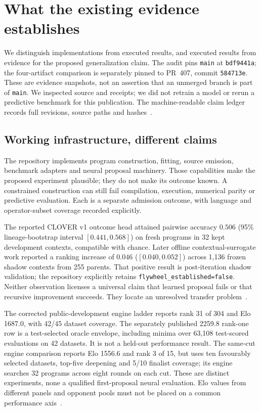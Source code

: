 \section{What the existing evidence establishes}
\label{sec:evidence}

We distinguish implementations from executed results, and executed results from evidence for the proposed generalization claim. The audit pins \texttt{main} at \texttt{bdf9441a}; the four-artifact comparison is separately pinned to PR~407, commit \texttt{584713e}. These are evidence snapshots, not an assertion that an unmerged branch is part of \texttt{main}. We inspected source and receipts; we did not retrain a model or rerun a predictive benchmark for this publication. The machine-readable claim ledger records full revisions, source paths and hashes~\citep{jope,clover}.

\subsection{Working infrastructure, different claims}
The repository implements program construction, fitting, source emission, benchmark adapters and neural proposal machinery. Those capabilities make the proposed experiment plausible; they do not make its outcome known. A constrained construction can still fail compilation, execution, numerical parity or predictive evaluation. Each is a separate admission outcome, with language and operator-subset coverage recorded explicitly.

The reported CLOVER v1 outcome head attained pairwise accuracy $0.506$ (95\% lineage-bootstrap interval $[0.441,0.568]$) on fresh programs in 32 kept development contexts, compatible with chance. Later offline contextual-surrogate work reported a ranking increase of $0.046$ ($[0.040,0.052]$) across 1,136 frozen shadow contexts from 255 parents. That positive result is post-iteration shadow validation; the repository explicitly retains \texttt{flywheel\_established=false}. Neither observation licenses a universal claim that learned proposal fails or that recursive improvement succeeds. They locate an unresolved transfer problem~\citep{clover}.

The corrected public-development engine ladder reports rank 31 of 304 and Elo 1687.0, with 42/45 dataset coverage. The separately published 2259.8 rank-one row is a test-selected oracle envelope, including minima over 63,108 test-scored evaluations on 42 datasets. It is not a held-out performance result. The same-cut engine comparison reports Elo 1556.6 and rank 3 of 15, but uses ten favourably selected datasets, top-five deepening and 5/10 finalist coverage; its engine searches 32 programs across eight rounds on each cut. These are distinct experiments, none a qualified first-proposal neural evaluation. Elo values from different panels and opponent pools must not be placed on a common performance axis~\citep{jope}.

